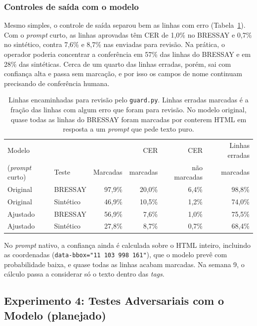 \documentclass[12pt,a4paper]{article}
\begin{document}
\subsubsection{Controles de saída com o modelo}
\label{subsec:guard-modelo}

Mesmo simples, o controle de saída separou bem as linhas com erro (Tabela~\ref{tab:guard}). Com o \emph{prompt} curto, as linhas aprovadas têm CER de 1,0\% no BRESSAY e 0,7\% no sintético, contra 7,6\% e 8,7\% nas enviadas para revisão. Na prática, o operador poderia concentrar a conferência em 57\% das linhas do BRESSAY e em 28\% das sintéticas. Cerca de um quarto das linhas erradas, porém, sai com confiança alta e passa sem marcação, e por isso os campos de nome continuam precisando de conferência humana.

\begin{table}[H]
\centering
\small
\begin{tabular}{@{}llrrrr@{}}
\toprule
Modelo & & & CER & CER & Linhas erradas \\
(\emph{prompt} curto) & Teste & Marcadas & marcadas & não marcadas & marcadas \\
\midrule
Original & BRESSAY & 97,9\% & 20,0\% & 6,4\% & 98,8\% \\
Original & Sintético & 46,9\% & 10,5\% & 1,2\% & 74,0\% \\
Ajustado & BRESSAY & 56,9\% & 7,6\% & 1,0\% & 75,5\% \\
Ajustado & Sintético & 27,8\% & 8,7\% & 0,7\% & 68,4\% \\
\bottomrule
\end{tabular}
\caption{Linhas encaminhadas para revisão pelo \texttt{guard.py}. Linhas erradas marcadas é a fração das linhas com algum erro que foram para revisão. No modelo original, quase todas as linhas do BRESSAY foram marcadas por conterem HTML em resposta a um \emph{prompt} que pede texto puro.}
\label{tab:guard}
\end{table}

No \emph{prompt} nativo, a confiança ainda é calculada sobre o HTML inteiro, incluindo as coordenadas (\texttt{data-bbox="11 103 998 161"}), que o modelo prevê com probabilidade baixa, e quase todas as linhas acabam marcadas. Na semana 9, o cálculo passa a considerar só o texto dentro das \emph{tags}.

\subsection{Experimento 4: Testes Adversariais com o Modelo (planejado)}
\label{subsec:exp4}
\end{document}
